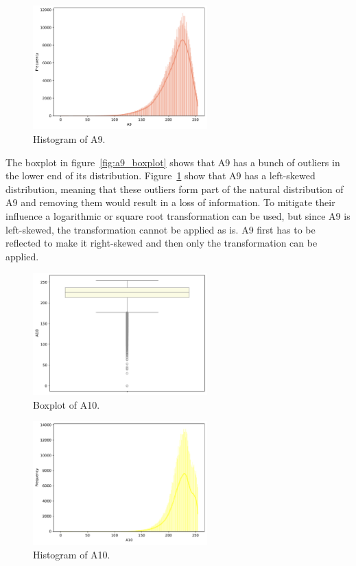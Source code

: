 \documentclass[11pt]{report}
\begin{document}
\begin{figure}[H]
    \centering
    \includegraphics[width=0.6\textwidth]{images/A9_histplot.pdf}
    \caption{Histogram of A9.}
    \label{fig:a9_histplot}
\end{figure}

The boxplot in figure~\ref{fig:a9_boxplot} shows that A9 has a bunch of outliers in the lower end of its distribution. Figure~\ref{fig:a9_histplot} show that A9 has a left-skewed distribution, meaning that these outliers form part of the natural distribution of A9 and removing them would result in a loss of information. To mitigate their influence a logarithmic or square root transformation can be used, but since A9 is left-skewed, the transformation cannot be applied as is. A9 first has to be reflected to make it right-skewed and then only the transformation can be applied.

\begin{figure}[H]
    \centering
    \includegraphics[width=0.6\textwidth]{images/A10_boxplot.pdf}
    \caption{Boxplot of A10.}
    \label{fig:a10_boxplot}
\end{figure}

\begin{figure}[H]
    \centering
    \includegraphics[width=0.6\textwidth]{images/A10_histplot.pdf}
    \caption{Histogram of A10.}
    \label{fig:a10_histplot}
\end{figure}
\end{document}
